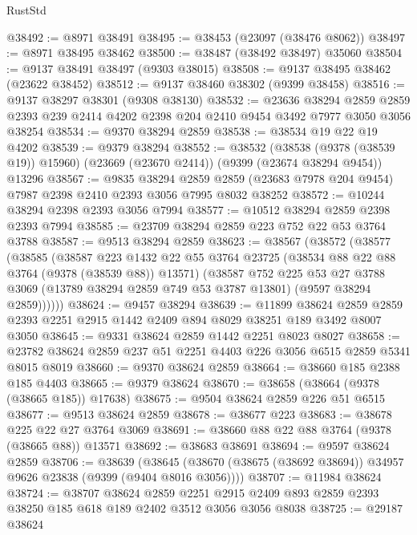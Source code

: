 \begin{lexlean}{RustStd}
\begin{coremodule}
@38492 := @8971 @38491
@38495 := @38453 (@23097 (@38476 @8062))
@38497 := @8971 @38495 @38462
@38500 := @38487 (@38492 @38497) @35060
@38504 := @9137 @38491 @38497 (@9303 @38015)
@38508 := @9137 @38495 @38462 (@23622 @38452)
@38512 := @9137 @38460 @38302 (@9399 @38458)
@38516 := @9137 @38297 @38301 (@9308 @38130)
@38532 := @23636
    @38294
    @2859
    @2859
    @2393
    @239
    @2414
    @4202
    @2398
    @204
    @2410
    @9454
    @3492
    @7977
    @3050
    @3056
    @38254
@38534 := @9370 @38294 @2859
@38538 := @38534 @19 @22 @19 @4202
@38539 := @9379 @38294
@38552 := @38532
    (@38538 (@9378 (@38539 @19)) @15960)
    (@23669 (@23670 @2414))
    (@9399 (@23674 @38294 @9454))
    @13296
@38567 := @9835
    @38294
    @2859
    @2859
    (@23683 @7978 @204 @9454)
    @7987
    @2398
    @2410
    @2393
    @3056
    @7995
    @8032
    @38252
@38572 := @10244 @38294 @2398 @2393 @3056 @7994
@38577 := @10512 @38294 @2859 @2398 @2393 @7994
@38585 := @23709 @38294 @2859 @223 @752 @22 @53 @3764 @3788
@38587 := @9513 @38294 @2859
@38623 := @38567
    (@38572
      (@38577
        (@38585
          (@38587
            @223
            @1432
            @22
            @55
            @3764
            @23725
            (@38534 @88 @22 @88 @3764 (@9378 (@38539 @88)) @13571)
            (@38587
              @752
              @225
              @53
              @27
              @3788
              @3069
              (@13789 @38294 @2859 @749 @53 @3787 @13801)
              (@9597 @38294 @2859))))))
@38624 := @9457 @38294
@38639 := @11899
    @38624
    @2859
    @2859
    @2393
    @2251
    @2915
    @1442
    @2409
    @894
    @8029
    @38251
    @189
    @3492
    @8007
    @3050
@38645 := @9331 @38624 @2859 @1442 @2251 @8023 @8027
@38658 := @23782 @38624 @2859 @237 @51 @2251 @4403 @226 @3056 @6515 @2859 @5341 @8015 @8019
@38660 := @9370 @38624 @2859
@38664 := @38660 @185 @2388 @185 @4403
@38665 := @9379 @38624
@38670 := @38658 (@38664 (@9378 (@38665 @185)) @17638)
@38675 := @9504 @38624 @2859 @226 @51 @6515
@38677 := @9513 @38624 @2859
@38678 := @38677 @223
@38683 := @38678 @225 @22 @27 @3764 @3069
@38691 := @38660 @88 @22 @88 @3764 (@9378 (@38665 @88)) @13571
@38692 := @38683 @38691
@38694 := @9597 @38624 @2859
@38706 := @38639
    (@38645 (@38670 (@38675 (@38692 @38694)) @34957 @9626 @23838 (@9399 (@9404 @8016 @3056))))
@38707 := @11984 @38624
@38724 := @38707
    @38624
    @2859
    @2251
    @2915
    @2409
    @893
    @2859
    @2393
    @38250
    @185
    @618
    @189
    @2402
    @3512
    @3056
    @3056
    @8038
@38725 := @29187 @38624

\end{coremodule}
\end{lexlean}

